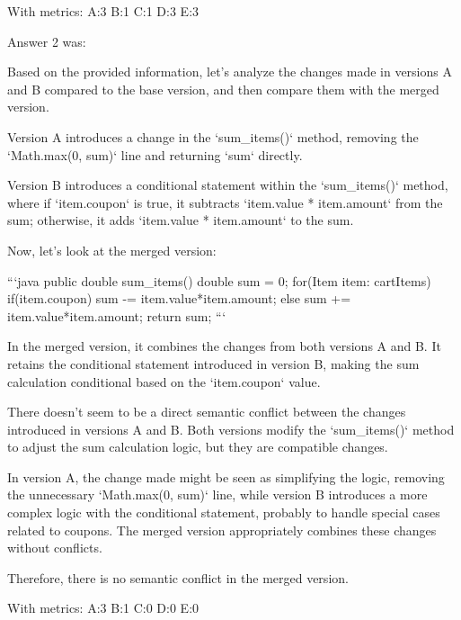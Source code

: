 With metrics:
A:3
B:1
C:1
D:3
E:3

Answer 2 was:
\begin{spverbatim}
Based on the provided information, let's analyze the changes made in versions A and B compared to the base version, and then compare them with the merged version.

Version A introduces a change in the `sum_items()` method, removing the `Math.max(0, sum)` line and returning `sum` directly.

Version B introduces a conditional statement within the `sum_items()` method, where if `item.coupon` is true, it subtracts `item.value * item.amount` from the sum; otherwise, it adds `item.value * item.amount` to the sum.

Now, let's look at the merged version:

```java
public double sum_items() {
    double sum = 0;
    for(Item item: cartItems) {
        if(item.coupon)
            sum -= item.value*item.amount;
        else
            sum += item.value*item.amount;
    }
    return sum;
}
```

In the merged version, it combines the changes from both versions A and B. It retains the conditional statement introduced in version B, making the sum calculation conditional based on the `item.coupon` value.

There doesn't seem to be a direct semantic conflict between the changes introduced in versions A and B. Both versions modify the `sum_items()` method to adjust the sum calculation logic, but they are compatible changes.

In version A, the change made might be seen as simplifying the logic, removing the unnecessary `Math.max(0, sum)` line, while version B introduces a more complex logic with the conditional statement, probably to handle special cases related to coupons. The merged version appropriately combines these changes without conflicts.

Therefore, there is no semantic conflict in the merged version.
\end{spverbatim}

With metrics:
A:3
B:1
C:0
D:0
E:0

